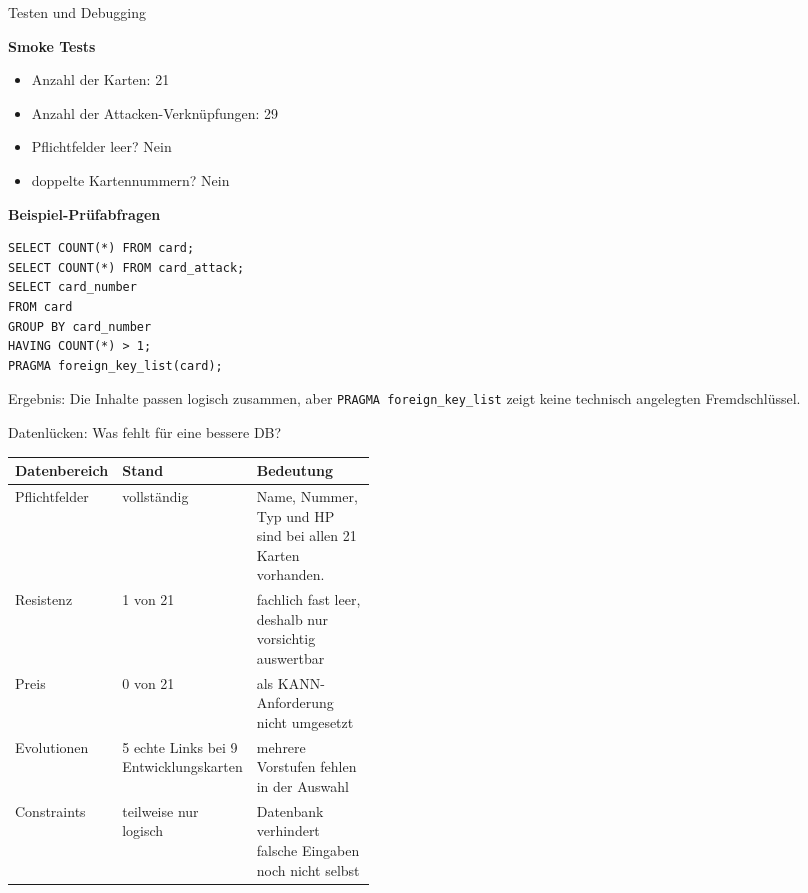 \documentclass[aspectratio=169,11pt]{beamer}
\begin{document}
\begin{frame}[fragile]{Testen und Debugging}
  \begin{minipage}[t]{0.49\textwidth}
    \begin{panel}
      {\bfseries Smoke Tests}\par
      \begin{itemize}
        \item Anzahl der Karten: 21
        \item Anzahl der Attacken-Verkn\"upfungen: 29
        \item Pflichtfelder leer? Nein
        \item doppelte Kartennummern? Nein
      \end{itemize}
    \end{panel}
  \end{minipage}\hfill
  \begin{minipage}[t]{0.49\textwidth}
    \begin{panel}
      {\bfseries Beispiel-Pr\"ufabfragen}\par
\begin{lstlisting}
SELECT COUNT(*) FROM card;
SELECT COUNT(*) FROM card_attack;
SELECT card_number
FROM card
GROUP BY card_number
HAVING COUNT(*) > 1;
PRAGMA foreign_key_list(card);
\end{lstlisting}
    \end{panel}
  \end{minipage}
  \vspace{0.25cm}
  \small\color{muted}Ergebnis: Die Inhalte passen logisch zusammen, aber \texttt{PRAGMA foreign\_key\_list} zeigt keine technisch angelegten Fremdschl\"ussel.
\end{frame}

\begin{frame}{Datenl\"ucken: Was fehlt f\"ur eine bessere DB?}
  \begin{panel}
    \begin{tabularx}{\linewidth}{@{}L{0.24\linewidth}L{0.18\linewidth}Y@{}}
      \toprule
      \textbf{Datenbereich} & \textbf{Stand} & \textbf{Bedeutung} \\
      \midrule
      Pflichtfelder & vollst\"andig & Name, Nummer, Typ und HP sind bei allen 21 Karten vorhanden. \\
      Resistenz & 1 von 21 & fachlich fast leer, deshalb nur vorsichtig auswertbar \\
      Preis & 0 von 21 & als KANN-Anforderung nicht umgesetzt \\
      Evolutionen & 5 echte Links bei 9 Entwicklungskarten & mehrere Vorstufen fehlen in der Auswahl \\
      Constraints & teilweise nur logisch & Datenbank verhindert falsche Eingaben noch nicht selbst \\
      \bottomrule
    \end{tabularx}
  \end{panel}
\end{frame}
\end{document}

